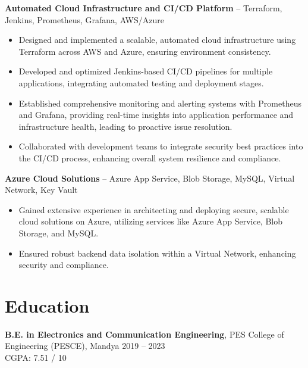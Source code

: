 \documentclass[a4paper,10pt]{article}
\begin{document}
	\textbf{Automated Cloud Infrastructure and CI/CD Platform} – Terraform, Jenkins, Prometheus, Grafana, AWS/Azure
\begin{itemize}[leftmargin=0.25in, label=\textbullet]
    \item Designed and implemented a scalable, automated cloud infrastructure using Terraform across AWS and Azure, ensuring environment consistency.
    \item Developed and optimized Jenkins-based CI/CD pipelines for multiple applications, integrating automated testing and deployment stages.
    \item Established comprehensive monitoring and alerting systems with Prometheus and Grafana, providing real-time insights into application performance and infrastructure health, leading to proactive issue resolution.
    \item Collaborated with development teams to integrate security best practices into the CI/CD process, enhancing overall system resilience and compliance.
\end{itemize}







\textbf{Azure Cloud Solutions} – Azure App Service, Blob Storage, MySQL, Virtual Network, Key Vault
\begin{itemize}[leftmargin=0.25in, label=\textbullet]
    \item Gained extensive experience in architecting and deploying secure, scalable cloud solutions on Azure, utilizing services like Azure App Service, Blob Storage, and MySQL.

    \item Ensured robust backend data isolation within a Virtual Network, enhancing security and compliance.
\end{itemize}

\section*{Education}
\textbf{B.E. in Electronics and Communication Engineering}, PES College of Engineering (PESCE), Mandya \hfill 2019 – 2023 \\CGPA: 7.51 / 10
\end{document}
